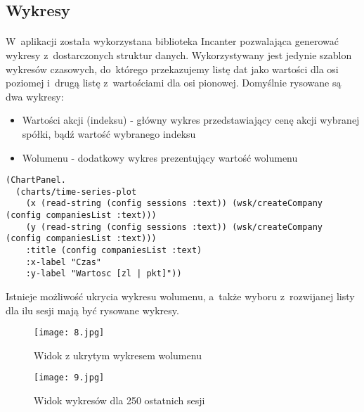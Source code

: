 \subsection{Wykresy}

\paragraph{}
W~aplikacji została wykorzystana biblioteka Incanter\cite{incanter} pozwalająca generować wykresy z~dostarczonych struktur danych. Wykorzystywany jest jedynie szablon wykresów czasowych, do~którego przekazujemy listę dat jako wartości dla osi poziomej i~drugą listę z~wartościami dla osi pionowej. Domyślnie rysowane są dwa wykresy:
\begin{itemize}
	\item Wartości akcji (indeksu) - główny wykres przedstawiający cenę akcji wybranej spółki, bądź wartość wybranego indeksu
	\item Wolumenu - dodatkowy wykres prezentujący wartość wolumenu
\end{itemize}

\begin{lstlisting}
(ChartPanel. 
  (charts/time-series-plot 
    (x (read-string (config sessions :text)) (wsk/createCompany (config companiesList :text))) 
    (y (read-string (config sessions :text)) (wsk/createCompany (config companiesList :text)))
    :title (config companiesList :text)
    :x-label "Czas"
    :y-label "Wartosc [zl | pkt]"))
\end{lstlisting}

Istnieje możliwość ukrycia wykresu wolumenu, a~także wyboru z~rozwijanej listy dla ilu sesji mają być rysowane wykresy.

\begin{figure}[H]
	\centering
	\texttt{[image: 8.jpg]}
	\caption{Widok z ukrytym wykresem wolumenu}
	\label{fig:8}
\end{figure}

\begin{figure}[H]
	\centering
	\texttt{[image: 9.jpg]}
	\caption{Widok wykresów dla 250 ostatnich sesji}
	\label{fig:9}
\end{figure}

